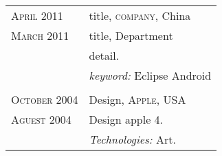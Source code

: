 %
%




\begin{longtable}{R{2.5cm}|p{14.8cm}}

 	\textsc{April 2011} & title, \textsc{company}, China\\
 	\textsc{March 2011}& title, Department\\&
 	\footnotesize{detail.}\\&
 	\footnotesize{\emph{keyword:} Eclipse  Android  }\\
 \\

 	\textsc{October 2004} & Design, \textsc{Apple}, USA\\
 	\textsc{Aguest 2004}&\footnotesize{ Design apple 4. }\\&
 	\footnotesize{\emph{Technologies:} Art.}\\
\end{longtable}
